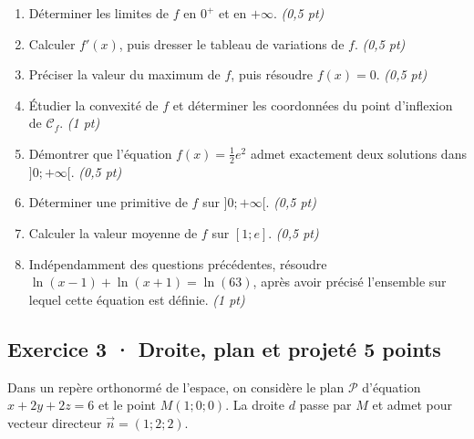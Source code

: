 \begin{enumerate}

\item Déterminer les limites de $f$ en $0^+$ et en $+\infty$. \hfill\textit{(0,5 pt)}

\item Calculer $f' (x)$, puis dresser le tableau de variations de $f$. \hfill\textit{(0,5 pt)}

\item Préciser la valeur du maximum de $f$, puis résoudre $f(x)=0$. \hfill\textit{(0,5 pt)}

\item Étudier la convexité de $f$ et déterminer les coordonnées du point d'inflexion de $\mathcal C_f$. \hfill\textit{(1 pt)}

\item Démontrer que l'équation $f(x)=\frac12 e^{2}$ admet exactement deux solutions dans $]0;+\infty[$. \hfill\textit{(0,5 pt)}

\item Déterminer une primitive de $f$ sur $]0;+\infty[$. \hfill\textit{(0,5 pt)}

\item Calculer la valeur moyenne de $f$ sur $[1;e]$. \hfill\textit{(0,5 pt)}

\item Indépendamment des questions précédentes, résoudre $\ln(x-1)+\ln(x+1)=\ln(63)$, après avoir précisé l'ensemble sur lequel cette équation est définie. \hfill\textit{(1 pt)}

\end{enumerate}

\clearpage{}\par

\subsection*{Exercice 3 · Droite, plan et projeté \hfill 5 points}Dans un repère orthonormé de l'espace, on considère le plan $\mathcal P$ d'équation $x+2y+2z=6$ et le point $M(1;0;0)$. La droite $d$ passe par $M$ et admet pour vecteur directeur $\vec n=(1;2;2)$.

